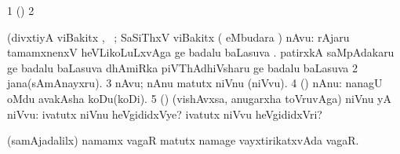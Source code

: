 \bentry
{} 
\gl{\saMkiSx}
\expl{}
\bmng
{} 
\emng
\eentry

\bentry
{} 
\gl{\saMkiSx}
\expl{}
\bmng
\bnum
\num{1} (\birx)  
\num{2}  
\enum
\emng
\eentry

\bentry
{} 
\gl{\sanA}
\expl{}
\bmng
(divxtiyA viBakitx  \AtAmx, \pArxparx\ ; SaSiThxV viBakitx  
\bnum
{} ( eMbudara \bava) nAvu: 
\banum
{}  rAjaru tamamxnenxV heVLikoLuLxvAga  ge badalu baLasuva . 
  patirxkA saMpAdakaru  ge badalu baLasuva  
  dhAmiRka piVThAdhiVsharu  ge badalu baLasuva  
\eanum
\numie
\num{2} jana(sAmAnayxru). 
\num{3} nAvu; nAnu matutx niVnu (niVvu). 
\num{4} (\AmA) nAnu:  nanagU oMdu avakAsha koDu(koDi). 
\num{5} (\AmA) (vishAvxsa, anugarxha toVruvAga) niVnu yA niVvu:  ivatutx niVnu heVgididxVye? ivatutx niVvu heVgididxVri? 
\enum
\emng

\noindent 
\gl{\pagu}
\expl{}
\bmng
{} (samAjadalilx) namamx vagaR matutx namage vayxtirikatxvAda vagaR. 
\emng
\eentry

\bentry
{}
\gl{\saMkiSx}
\expl{}
\bmng
{} 
\emng
\eentry

